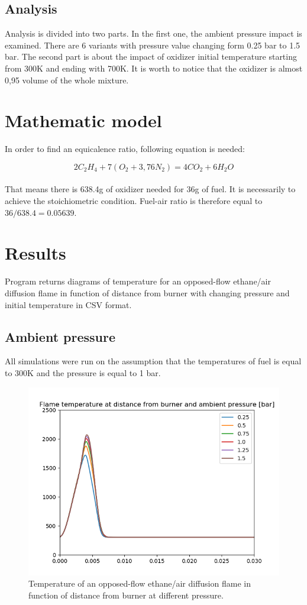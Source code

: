 \documentclass[a4paper]{article}
\newcommand{\sepspace}{\vspace*{1em}}
\begin{document}
\subsection{Analysis}
Analysis is divided into two parts. In the first one, the ambient pressure impact is examined. There are 6 variants with pressure value changing form 0.25 bar to 1.5 bar. The second part is about the impact of oxidizer initial temperature starting from 300K and ending with 700K. It is worth to notice that the oxidizer is almost 0,95 volume of the whole mixture.

\sepspace
\sepspace
\section{Mathematic model}

In order to find an equicalence ratio, following equation is needed:

\[{2C_2H_4 +7(O_2+3,76N_2) }
      = {4CO_2+6H_2 O}\] 
\\
That means there is 638.4g of oxidizer needed for 36g of fuel. It is necessarily to achieve the stoichiometric condition. Fuel-air ratio is therefore equal to $36/638.4=0.05639$.

\sepspace
\sepspace
\section{Results}
Program returns diagrams of temperature for an opposed-flow ethane/air diffusion flame in function of distance from burner with changing pressure and initial temperature in CSV format.
\pagebreak


\subsection{Ambient pressure}


All simulations were run on the assumption that the temperatures of fuel is equal to 300K and the pressure is equal to 1 bar. 

\begin{figure} [h]
\includegraphics[width=1\textwidth]{c2h6_diffusion_pressure.png}
\caption{\label{fig:1}Temperature of an opposed-flow ethane/air diffusion flame in function of distance from burner at different pressure.}
\end{figure}
\end{document}
